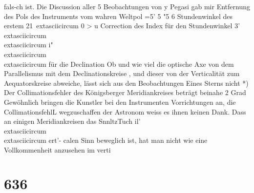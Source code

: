 \documentclass[12pt,a4paper]{article}
\begin{document}
{{{{{{{{fals-ch  ist. Die  Discussion  aller  5  Beobachtungen  von  y  Pegasi  gab  mir Entfernung  des  Pols  des  Instruments  vom  wahren  Weltpol    =5'   5 "5 6 Stundenwinkel  des  erstem 21\	extasciicircum{}{ }0      >       u Correction  des  Index  für  den  Stundenwinkel    3'    \\	extasciicircum{}{ }{ }\\	extasciicircum{}{ }{ }i"\\	extasciicircum{}{ }{ }\\	extasciicircum{}{ }{ } für  die  Declination Ob  und  wie  viel  die  optische  Axe  von  dem  Parallelismus  mit  dem  Declinationskreise ,  und  dieser von  der  Verticalität  zum  Aequatorskreise  abweiche,  lässt  sich  aus  den  Beobachtungen  Eines  Sterns  nicht *)  Der  Collimationsfehler  des  Königsberger  Meridiankreises  beträgt  beinahe  2  Grad  Gewöhnlich bringen  die  Kunstler  bei  den  Instrumenten  Vorrichtungen  an,  die  CollimationsfehlL  wegzuschaffen  der Astronom  weiss  es  ihnen  keinen  Dank.  Dass  an  einigen  Meridiankreisen  das  SnnltzTuch  il'\\	extasciicircum{}{ }{ }\\	extasciicircum{}{ }{ }ert'- calen  Sinn  beweglich  ist,  hat  man  nicht  wie  eine  Vollkommenheit  anzusehen  im  verti


\section*{636}

}}}}}}}}
\end{document}
